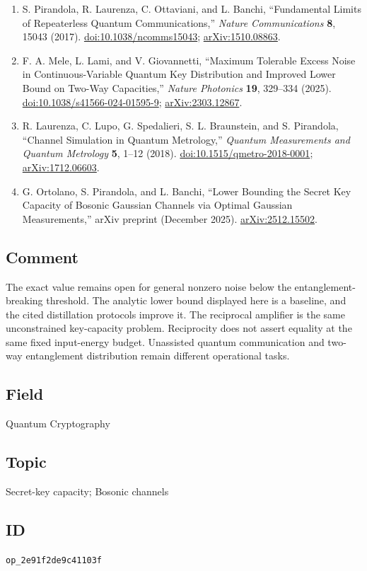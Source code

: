 \begin{enumerate}[label={},leftmargin=4.8em,labelsep=0.5em]
  \footnotesize
  \item[\textup{[PLOB17]}]\label{ref:sc-plob}
  S. Pirandola, R. Laurenza, C. Ottaviani, and L. Banchi, ``Fundamental Limits of Repeaterless Quantum Communications,'' \emph{Nature Communications} \textbf{8}, 15043 (2017). \href{https://doi.org/10.1038/ncomms15043}{doi:10.1038/ncomms15043}; \href{https://arxiv.org/abs/1510.08863}{arXiv:1510.08863}.

  \item[\textup{[MLG25]}]\label{ref:sc-mele}
  F. A. Mele, L. Lami, and V. Giovannetti, ``Maximum Tolerable Excess Noise in Continuous-Variable Quantum Key Distribution and Improved Lower Bound on Two-Way Capacities,'' \emph{Nature Photonics} \textbf{19}, 329--334 (2025). \href{https://doi.org/10.1038/s41566-024-01595-9}{doi:10.1038/s41566-024-01595-9}; \href{https://arxiv.org/abs/2303.12867}{arXiv:2303.12867}.

  \item[\textup{[LLSBP18]}]\label{ref:sc-bk}
  R. Laurenza, C. Lupo, G. Spedalieri, S. L. Braunstein, and S. Pirandola, ``Channel Simulation in Quantum Metrology,'' \emph{Quantum Measurements and Quantum Metrology} \textbf{5}, 1--12 (2018). \href{https://doi.org/10.1515/qmetro-2018-0001}{doi:10.1515/qmetro-2018-0001}; \href{https://arxiv.org/abs/1712.06603}{arXiv:1712.06603}.

  \item[\textup{[OPB25]}]\label{ref:sc-gaussian-optimal}
  G. Ortolano, S. Pirandola, and L. Banchi, ``Lower Bounding the Secret Key Capacity of Bosonic Gaussian Channels via Optimal Gaussian Measurements,'' arXiv preprint (December 2025). \href{https://arxiv.org/abs/2512.15502}{arXiv:2512.15502}.
\end{enumerate}

\subsection*{Comment}

The exact value remains open for general nonzero noise below the entanglement-breaking threshold. The analytic lower bound displayed here is a baseline, and the cited distillation protocols improve it. The reciprocal amplifier is the same unconstrained key-capacity problem. Reciprocity does not assert equality at the same fixed input-energy budget. Unassisted quantum communication and two-way entanglement distribution remain different operational tasks.

\subsection*{Field}

Quantum Cryptography

\subsection*{Topic}

Secret-key capacity; Bosonic channels

\subsection*{ID}

\texttt{op\_2e91f2de9c41103f}
